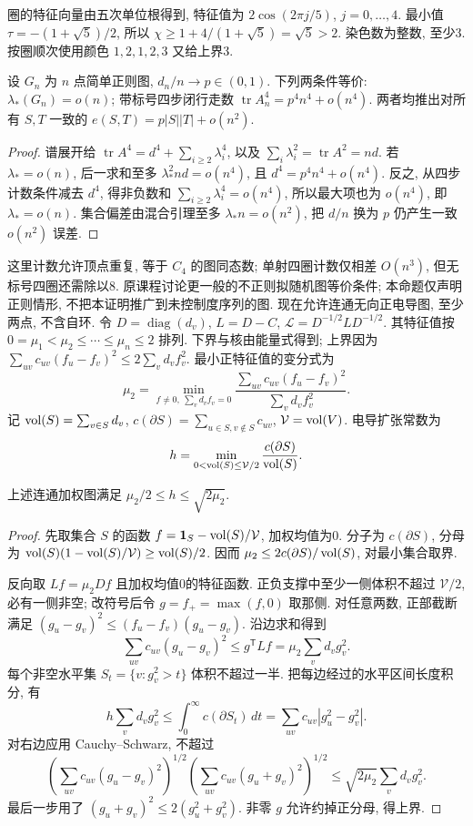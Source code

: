\begin{solution}
圈的特征向量由五次单位根得到, 特征值为 $2\cos(2\pi j/5)$, $j=0,\ldots,4$. 最小值 $\tau=-(1+\sqrt5)/2$, 所以 $\chi\ge1+4/(1+\sqrt5)=\sqrt5>2$. 染色数为整数, 至少3. 按圈顺次使用颜色 $1,2,1,2,3$ 又给上界3.
\end{solution}
\begin{proposition}\label{prop:regularquasi}
设 $G_n$ 为 $n$ 点简单正则图, $d_n/n\to p\in(0,1)$. 下列两条件等价: $\lambda_*(G_n)=o(n)$; 带标号四步闭行走数 $\operatorname{tr}A_n^4=p^4n^4+o(n^4)$. 两者均推出对所有 $S,T$ 一致的 $e(S,T)=p|S||T|+o(n^2)$.
\end{proposition}
\begin{proof}
谱展开给 $\operatorname{tr}A^4=d^4+\sum_{i\ge2}\lambda_i^4$, 以及 $\sum_i\lambda_i^2=\operatorname{tr}A^2=nd$. 若 $\lambda_*=o(n)$, 后一求和至多 $\lambda_*^2 nd=o(n^4)$, 且 $d^4=p^4n^4+o(n^4)$. 反之, 从四步计数条件减去 $d^4$, 得非负数和 $\sum_{i\ge2}\lambda_i^4=o(n^4)$, 所以最大项也为 $o(n^4)$, 即 $\lambda_*=o(n)$. 集合偏差由混合引理至多 $\lambda_* n=o(n^2)$, 把 $d/n$ 换为 $p$ 仍产生一致 $o(n^2)$ 误差.
\end{proof}
这里计数允许顶点重复, 等于 $C_4$ 的图同态数; 单射四圈计数仅相差 $O(n^3)$, 但无标号四圈还需除以8. 原课程讨论更一般的不正则拟随机图等价条件; 本命题仅声明正则情形, 不把本证明推广到未控制度序列的图.
现在允许连通无向正电导图, 至少两点, 不含自环. 令 $D=\operatorname{diag}(d_v)$, $L=D-C$, $\mathcal L=D^{-1/2}LD^{-1/2}$. 其特征值按 $0=\mu_1<\mu_2\le\cdots\le\mu_n\le2$ 排列. 下界与核由能量式得到; 上界因为 $\sum_{uv}c_{uv}(f_u-f_v)^2\le2\sum_vd_v f_v^2$. 最小正特征值的变分式为
\[
\mu_2=\min_{f\ne0,\ \sum_vd_vf_v=0}
\frac{\sum_{uv}c_{uv}(f_u-f_v)^2}{\sum_vd_v f_v^2}.
\]
记 $\operatorname{vol}(S)=\sum_{v\in S}d_v$, $c(\partial S)=\sum_{u\in S,v\notin S}c_{uv}$, $\mathcal V=\operatorname{vol}(V)$. 电导扩张常数为
\[
h=\min_{0<\operatorname{vol}(S)\le\mathcal V/2}\frac{c(\partial S)}{\operatorname{vol}(S)}.
\]
\begin{theorem}\label{thm:cheeger}
上述连通加权图满足 $\mu_2/2\le h\le\sqrt{2\mu_2}$.
\end{theorem}
\begin{proof}
先取集合 $S$ 的函数 $f=\mathbf1_S-\operatorname{vol}(S)/\mathcal V$, 加权均值为0. 分子为 $c(\partial S)$, 分母为 $\operatorname{vol}(S)(1-\operatorname{vol}(S)/\mathcal V)\ge\operatorname{vol}(S)/2$. 因而 $\mu_2\le2c(\partial S)/\operatorname{vol}(S)$, 对最小集合取界.

反向取 $Lf=\mu_2 Df$ 且加权均值0的特征函数. 正负支撑中至少一侧体积不超过 $\mathcal V/2$, 必有一侧非空; 改符号后令 $g=f_+=\max(f,0)$ 取那侧. 对任意两数, 正部截断满足 $(g_u-g_v)^2\le(f_u-f_v)(g_u-g_v)$. 沿边求和得到
\[
\sum_{uv}c_{uv}(g_u-g_v)^2\le g^{\mathsf T}Lf
=\mu_2\sum_vd_vg_v^2.
\]
每个非空水平集 $S_t=\{v:g_v^2>t\}$ 体积不超过一半. 把每边经过的水平区间长度积分, 有
\[
h\sum_vd_vg_v^2\le\int_0^\infty c(\partial S_t)\,dt
=\sum_{uv}c_{uv}|g_u^2-g_v^2|.
\]
对右边应用 Cauchy--Schwarz, 不超过
\[
\left(\sum_{uv}c_{uv}(g_u-g_v)^2\right)^{1/2}
\left(\sum_{uv}c_{uv}(g_u+g_v)^2\right)^{1/2}
\le\sqrt{2\mu_2}\sum_vd_vg_v^2.
\]
最后一步用了 $(g_u+g_v)^2\le2(g_u^2+g_v^2)$. 非零 $g$ 允许约掉正分母, 得上界.
\end{proof}
